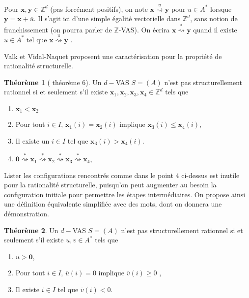 \documentclass[a4paper,final]{article}
\theoremstyle{definition}
\newtheorem{Theorem}{Théorème}
\let\leq\leqslant
\let\geq\geqslant
\newcommand{\Z}{\ensuremath{\mathbb{Z}}}
\newcommand{\transZ}[1]{\ensuremath{\stackrel{#1}{\rightsquigarrow}}}
\newcommand{\vect}[1]{\ensuremath{\mathbf{#1}}}
\newcommand{\valeur}[1]{\ensuremath{\overline{#1}}}
\begin{document}
Pour $\vect{x},\vect{y}\in\Z^d$ (pas forcément positifs), on note $\vect{x} \transZ{u} \vect{y}$ pour $u\in A^*$ lorsque $\vect{y} = \vect{x} + \valeur{u}$.
Il s'agit ici d'une simple égalité vectorielle dans $\Z^d$, sans notion de franchissement (on pourra parler de $\Z$-VAS).
On écrira $\vect{x} \transZ{*} \vect{y}$ quand il existe $u\in A^*$ tel que $\vect{x} \transZ{u} \vect{y}$ .

Valk et Vidal-Naquet proposent une caractérisation pour la propriété de rationalité structurelle.

\begin{Theorem}[\cite{vavi81} théorème 6]
Un $d-$VAS $S=(A)$ n'est pas structurellement rationnel si et seulement s'il existe $\vect{x}_1, \vect{x}_2, \vect{x}_3, \vect{x}_4 \in \Z^d$ tels que 
\begin{enumerate}
    \item $\vect{x}_1 < \vect{x}_2$
    \item Pour tout $i \in I$, $\vect{x}_1(i) = \vect{x}_2(i)$ implique $\vect{x}_3(i) \leq \vect{x}_4(i)$,
    \item Il existe un $i\in I$ tel que $\vect{x}_3(i) > \vect{x}_4(i)$.
    
    \item $\vect{0} \transZ{*} \vect{x}_1 \transZ{*} \vect{x}_2 \transZ{*} \vect{x}_3 \transZ{*} \vect{x}_4$,
\end{enumerate}
\end{Theorem}

Lister les configurations rencontrés comme dans le point 4 ci-dessus est inutile pour la rationalité structurelle, puisqu'on peut augmenter au besoin la configuration initiale  pour permettre les étapes intermédiaires.
On propose ainsi une définition équivalente simplifiée avec des mots, dont on donnera une démonstration.


\begin{Theorem}\label{conf_struct_rat}
Un $d-$VAS $S=(A)$ n'est pas structurellement rationnel si et seulement s'il existe $u,v\in A^*$ tels que 
\begin{enumerate}
    \item $\valeur{u} > \vect{0}$,
    \item Pour tout $i \in I$, $\valeur{u}(i)=0$ implique $\valeur{v}(i) \geq 0$ ,
    \item Il existe $i\in I$ tel que $\valeur{v}(i) < 0$.
\end{enumerate}
\end{Theorem}
\end{document}
